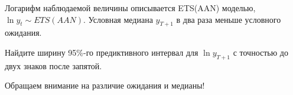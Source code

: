 
\begin{question}
Логарифм наблюдаемой величины описывается ETS(AAN) моделью, \(\ln y_t \sim ETS(AAN)\).
Условная медиана \(y_{T+1}\) в два раза меньше условного ожидания.

Найдите ширину 95\%-го предиктивного интервал для \(\ln y_{T+1}\) с точностью до двух знаков после запятой.
\end{question}

\begin{solution}
Обращаем внимание на различие ожидания и медианы!
\end{solution}

